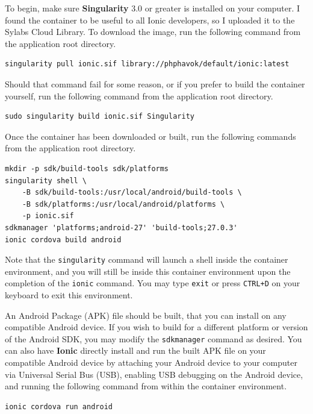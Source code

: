 \documentclass[12pt]{report}
\begin{document}
To begin, make sure \textbf{Singularity} 3.0 \cite{singularity3inst} or greater
is installed on your computer. I found the container to be useful to all Ionic
developers, so I uploaded it to the Sylabs Cloud Library. To download the image,
run the following command from the application root directory.

\begin{verbatim}
singularity pull ionic.sif library://phphavok/default/ionic:latest
\end{verbatim}

Should that command fail for some reason, or if you prefer to build the
container yourself, run the following command from the application root
directory.

\begin{verbatim}
sudo singularity build ionic.sif Singularity
\end{verbatim}

Once the container has been downloaded or built, run the following commands from
the application root directory.

\begin{verbatim}
mkdir -p sdk/build-tools sdk/platforms
singularity shell \
    -B sdk/build-tools:/usr/local/android/build-tools \
    -B sdk/platforms:/usr/local/android/platforms \
    -p ionic.sif
sdkmanager 'platforms;android-27' 'build-tools;27.0.3'
ionic cordova build android
\end{verbatim}

Note that the \texttt{singularity} command will launch a shell inside the
container environment, and you will still be inside this container environment
upon the completion of the \texttt{ionic} command. You may type \texttt{exit} or
press \texttt{CTRL+D} on your keyboard to exit this environment.

An Android Package (APK) file should be built, that you can install on any
compatible Android device. If you wish to build for a different platform or
version of the Android SDK, you may modify the \texttt{sdkmanager} command as
desired. You can also have \textbf{Ionic} directly install and run the built APK
file on your compatible Android device by attaching your Android device to your
computer via Universal Serial Bus (USB), enabling USB debugging on the Android
device, and running the following command from within the container environment.

\begin{verbatim}
ionic cordova run android
\end{verbatim}
\end{document}

